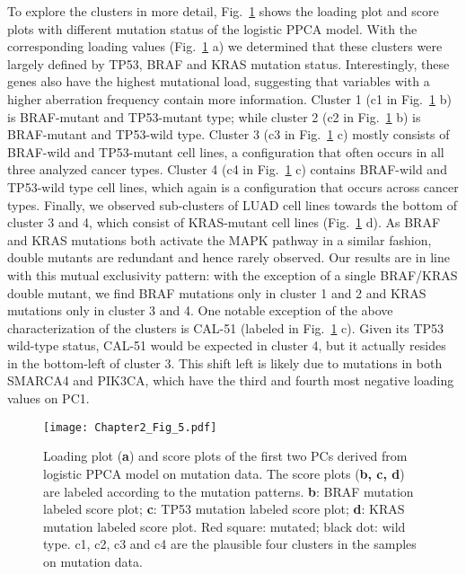 To explore the clusters in more detail, Fig.~\ref{chapter2_fig:7} shows the loading plot and score plots with different mutation status of the logistic PPCA model. With the corresponding loading values (Fig.~\ref{chapter2_fig:7} a) we determined that these clusters were largely defined by TP53, BRAF and KRAS mutation status. Interestingly, these genes also have the highest mutational load, suggesting that variables with a higher aberration frequency contain more information. Cluster 1 (c1 in Fig.~\ref{chapter2_fig:7} b) is BRAF-mutant and TP53-mutant type; while cluster 2 (c2 in Fig.~\ref{chapter2_fig:7} b) is BRAF-mutant and TP53-wild type. Cluster 3 (c3 in Fig.~\ref{chapter2_fig:7} c) mostly consists of BRAF-wild and TP53-mutant cell lines, a configuration that often occurs in all three analyzed cancer types. Cluster 4 (c4 in Fig.~\ref{chapter2_fig:7} c) contains BRAF-wild and TP53-wild type cell lines, which again is a configuration that occurs across cancer types. Finally, we observed sub-clusters of LUAD cell lines towards the bottom of cluster 3 and 4, which consist of KRAS-mutant cell lines (Fig.~\ref{chapter2_fig:7} d). As BRAF and KRAS mutations both activate the MAPK pathway in a similar fashion, double mutants are redundant and hence rarely observed. Our results are in line with this mutual exclusivity pattern: with the exception of a single BRAF/KRAS double mutant, we find BRAF mutations only in cluster 1 and 2 and KRAS mutations only in cluster 3 and 4. One notable exception of the above characterization of the clusters is CAL-51 (labeled in Fig.~\ref{chapter2_fig:7} c). Given its TP53 wild-type status, CAL-51 would be expected in cluster 4, but it actually resides in the bottom-left of cluster 3. This shift left is likely due to mutations in both SMARCA4 and PIK3CA, which have the third and fourth most negative loading values on PC1.
\begin{figure}[htbp]
    \centering
    \texttt{[image: Chapter2\_Fig\_5.pdf]}
    \caption{Loading plot (\textbf{a}) and score plots of the first two PCs derived from logistic PPCA model on mutation data. The score plots (\textbf{b, c, d}) are labeled according to the mutation patterns. \textbf{b}: BRAF mutation labeled score plot; \textbf{c}: TP53 mutation labeled score plot; \textbf{d}: KRAS mutation labeled score plot. Red square: mutated; black dot: wild type. c1, c2, c3 and c4 are the plausible four clusters in the samples on mutation data.}
    \label{chapter2_fig:7}
\end{figure}

